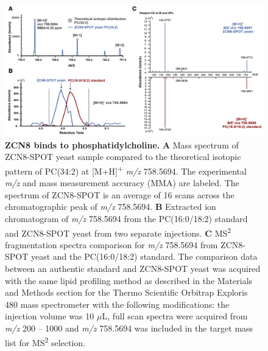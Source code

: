 \documentclass[9pt,twocolumn,twoside,lineno]{biorxiv}
\begin{document}
\begin{figure}[t]
\begin{center}
\includegraphics[width=0.8 \paperwidth]{Sup_Figures/Sup_Fig_14.png}
\caption{\textbf{ZCN8 binds to phosphatidylcholine.} \textbf{A} Mass spectrum of ZCN8-SPOT yeast sample compared to the theoretical isotopic pattern of PC(34:2) at [M+H]\textsuperscript{+} \textit{m/z} 758.5694. The experimental \textit{m/z} and mass measurement accuracy (MMA) are labeled. The spectrum of ZCN8-SPOT is an average of 16 scans across the chromatographic peak of \textit{m/z} 758.5694.  
\textbf{B} Extracted ion chromatogram of \textit{m/z} 758.5694 from the PC(16:0/18:2) standard and ZCN8-SPOT yeast from two separate injections.  
\textbf{C} MS\textsuperscript{2} fragmentation spectra comparison for \textit{m/z} 758.5694 from ZCN8-SPOT yeast and the PC(16:0/18:2) standard.
The comparison data between an authentic standard and ZCN8-SPOT yeast was acquired with the same lipid profiling method as described in the Materials and Methods section for the Thermo Scientific Orbitrap Exploris 480 mass spectrometer with the following modifications:  the injection volume was 10 $\mu$L, full scan spectra were acquired from \textit{m/z} 200 – 1000 and \textit{m/z} 758.5694 was included in the target mass
list for MS\textsuperscript{2} selection.}
\label{figure:Sup:ZCN8-PC}
\end{center}
\end{figure} 

\clearpage
\end{document}
